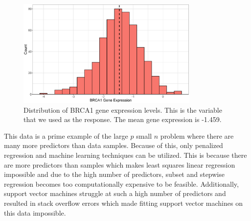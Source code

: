 \documentclass{article}
\begin{document}
\begin{figure}[h!]
	\centering
	\includegraphics[width = 0.8\textwidth]{images/empirical_histogram.eps}
	\captionsetup{width = 0.8\textwidth}
	\caption{Distribution of BRCA1 gene expression levels. This is the variable that we used as the response. The mean gene expression is -1.459.}
	\label{fig:BRCA1-distribution}
\end{figure}

This data is a prime example of the large $p$ small $n$ problem where there are many more predictors than data samples. Because of this, only penalized regression and machine learning techniques can be utilized. This is because there are more predictors than samples which makes least squares linear regression impossible and due to the high number of predictors, subset and stepwise regression becomes too computationally expensive to be feasible. Additionally, support vector machines struggle at such a high number of predictors and resulted in stack overflow errors which made fitting support vector machines on this data impossible.

\end{document}
